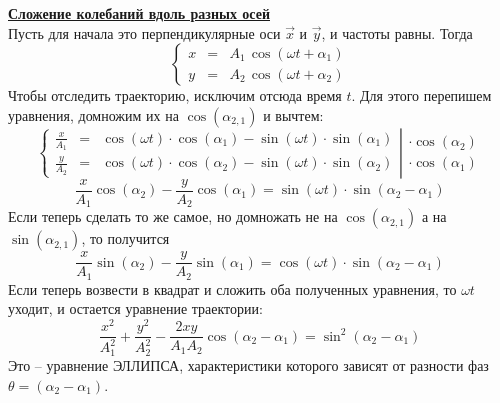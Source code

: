 \documentclass[12pt,epsfig,color,russian]{article}
\begin{document}
\underline{\bf Сложение колебаний вдоль разных осей}\\
Пусть для начала это перпендикулярные оси $\vec{x}$ и $\vec{y}$, и частоты равны. Тогда
\begin{displaymath}
\left\{
\begin{array}{lcr}
x&=&A_1\,\cos(\omega t+\alpha_1)\\
y&=&A_2\,\cos(\omega t+\alpha_2)
\end{array}
\right.
\end{displaymath}
Чтобы отследить траекторию, исключим отсюда время $t$. Для этого пе\-ре\-пи\-шем уравнения, домножим их на $\cos(\alpha_{2,1})$ и вычтем:
\begin{displaymath}
\left\{
\begin{array}{lcr}
\frac{x}{A_1}&=&\cos(\omega t)\cdot\cos(\alpha_1)-\sin(\omega t)\cdot\sin(\alpha_1) \\
\frac{y}{A_2}&=&\cos(\omega t)\cdot\cos(\alpha_2)-\sin(\omega t)\cdot\sin(\alpha_2)
\end{array}
\right|
\begin{array}{l}
\cdot\cos(\alpha_2)\\
\cdot\cos(\alpha_1)
\end{array}
\end{displaymath}
\begin{displaymath}
\frac{x}{A_1}\cos(\alpha_2)-\frac{y}{A_2}\cos(\alpha_1)=
\sin(\omega t)\cdot\sin(\alpha_2-\alpha_1)
\end{displaymath}
Если теперь сделать то же самое, но домножать не на $\cos(\alpha_{2,1})$ а на $\sin(\alpha_{2,1})$, то получится
\begin{displaymath}
\frac{x}{A_1}\sin(\alpha_2)-\frac{y}{A_2}\sin(\alpha_1)=
\cos(\omega t)\cdot\sin(\alpha_2-\alpha_1)
\end{displaymath}
Если теперь возвести в квадрат и сложить оба полученных уравнения, то
 $\omega t$ уходит, и остается уравнение траектории:
\begin{displaymath}
\frac{x^2}{A_1^2}+\frac{y^2}{A_2^2}-\frac{2xy}{A_1A_2}\cos(\alpha_2-\alpha_1)=
\sin^2(\alpha_2-\alpha_1)
\end{displaymath}
Это -- уравнение ЭЛЛИПСА, характеристики которого зависят от разности фаз $\theta=(\alpha_2-\alpha_1)$.
\end{document}
